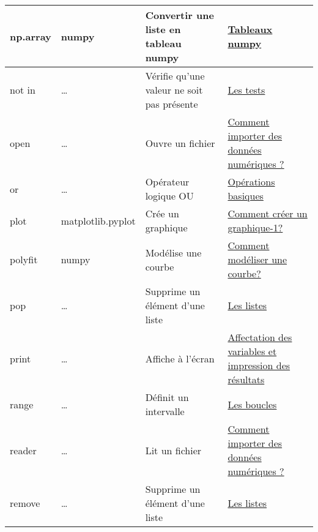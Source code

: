 \begin{longtable}{@{\extracolsep{\fill}}|p{} | p{} |p{} | p{}|@{}}
np.array
 &
 numpy
 & 
Convertir une liste en tableau numpy
 & 
\href{https://pyspc.readthedocs.io/fr/latest/05-bases/08-tableaux_numpy.html}{Tableaux numpy}
\\ \hline



not in
 & 
\ldots{}
 & 
Vérifie qu'une valeur ne soit pas présente
 & 
\href{https://pyspc.readthedocs.io/fr/latest/05-bases/05-tests.html}{Les
tests}
\\ \hline

open
 & 
\ldots{}
 & 
Ouvre un fichier
 & 
\href{https://pyspc.readthedocs.io/fr/latest/05-bases/09-fichiers-csv.html}{Comment
importer des données numériques ?}
\\ \hline

or
 & 
\ldots{}
 & 
Opérateur logique OU
 & 
\href{https://pyspc.readthedocs.io/fr/latest/05-bases/04-operations_basiques.html}{Opérations
basiques}
\\ \hline

plot
 & 
matplotlib.pyplot
 & 
Crée un graphique
 & 
\href{https://pyspc.readthedocs.io/fr/latest/05-bases/10-graphiques_partie_1.html}{Comment
créer un graphique-1?}
\\ \hline

polyfit
 & 
numpy
 & 
Modélise une courbe
 & 
\href{https://pyspc.readthedocs.io/fr/latest/05-bases/11-modelisation.html}{Comment
modéliser une courbe?}
\\ \hline

pop
 & 
\ldots{}
 & 
Supprime un élément d'une liste
 & 
\href{https://pyspc.readthedocs.io/fr/latest/05-bases/07-listes.html}{Les
listes}
\\ \hline

print
 & 
\ldots{}
 & 
Affiche à l'écran
 & 
\href{https://pyspc.readthedocs.io/fr/latest/05-bases/02-variables_input_print.html}{Affectation
des variables et impression des résultats}
\\ \hline

range
 & 
\ldots{}
 & 
Définit un intervalle
 & 
\href{https://pyspc.readthedocs.io/fr/latest/05-bases/06-boucles.html}{Les
boucles}
\\ \hline

reader
 & 
\ldots{}
 & 
Lit un fichier
 & 
\href{https://pyspc.readthedocs.io/fr/latest/05-bases/09-fichiers-csv.html}{Comment
importer des données numériques ?}
\\ \hline

remove
 & 
\ldots{}
 & 
Supprime un élément d'une liste
 & 
\href{https://pyspc.readthedocs.io/fr/latest/05-bases/07-listes.html}{Les
listes}
\\ \hline


\end{longtable}
